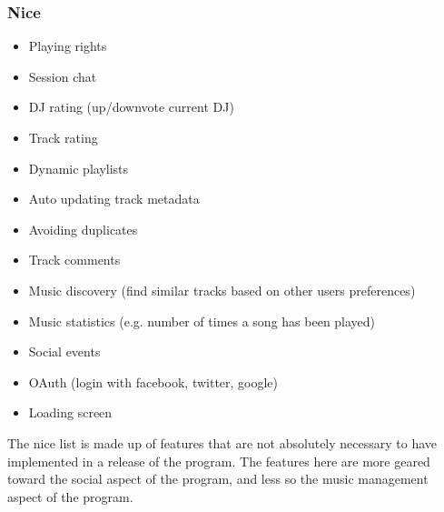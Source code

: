 \subsubsection{Nice}


\begin{itemize}
	\item Playing rights 
	\item Session chat
	\item DJ rating (up/downvote current DJ)
	\item Track rating
	\item Dynamic playlists
	\item Auto updating track metadata
	\item Avoiding duplicates
	\item Track comments
	\item Music discovery (find similar tracks based on other users preferences)
	\item Music statistics (e.g. number of times a song has been played) 
	\item Social events
	\item OAuth (login with facebook, twitter, google)
	\item Loading screen
\end{itemize}


The nice list is made up of features that are not absolutely necessary to have implemented in a release of the program. The features here are more geared toward the social aspect of the program, and less so the music management aspect of the program.